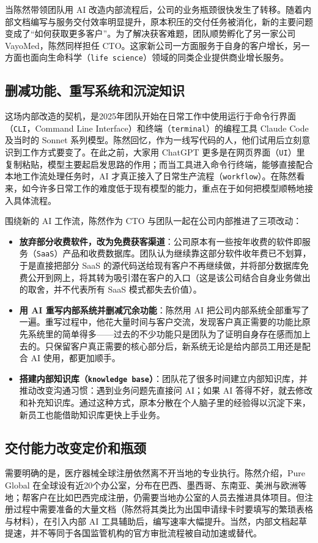 \documentclass[UTF8,a4paper,11pt,fontset=fandol]{ctexart}
\begin{document}
当陈然带领团队用 AI 改造内部流程后，公司的业务瓶颈很快发生了转移。随着内部文档编写与服务交付效率明显提升，原本积压的交付任务被消化，新的主要问题变成了“如何获取更多客户”。为了解决获客难题，团队顺势孵化了另一家公司 VayoMed，陈然同样担任 CTO。这家新公司一方面服务于自身的客户增长，另一方面也面向生命科学（\texttt{life science}）领域的同类企业提供商业增长服务。

\subsection{删减功能、重写系统和沉淀知识}
这场内部改造的契机，是2025年团队开始在日常工作中使用运行于命令行界面（\texttt{CLI}，Command Line Interface）和终端（\texttt{terminal}）的编程工具 Claude Code 及当时的 Sonnet 系列模型。陈然回忆，作为一线写代码的人，他们试用后立刻意识到工作方式要变了。在此之前，大家用 ChatGPT 更多是在网页界面（\texttt{UI}）里复制粘贴，模型主要起启发思路的作用；而当工具进入命令行终端，能够直接配合本地工作流处理任务时，AI 才真正接入了日常生产流程（\texttt{workflow}）。在陈然看来，如今许多日常工作的难度低于现有模型的能力，重点在于如何把模型顺畅地接入具体流程。

围绕新的 AI 工作流，陈然作为 CTO 与团队一起在公司内部推进了三项改动：
\begin{itemize}
\item \textbf{放弃部分收费软件，改为免费获客渠道}：公司原本有一些按年收费的软件即服务（\texttt{SaaS}）产品和收费数据库。团队认为继续靠这部分软件收年费已不划算，于是直接把部分 SaaS 的源代码送给现有客户不再继续做，并将部分数据库免费公开到网上，将其转为吸引潜在客户的入口（这是该公司结合自身业务做出的取舍，并不代表所有 SaaS 模式都失去价值）。
\item \textbf{用 AI 重写内部系统并删减冗余功能}：陈然用 AI 把公司内部系统全部重写了一遍。重写过程中，他花大量时间与客户交流，发现客户真正需要的功能比原先系统里的简单得多——过去的不少功能只是团队为了证明自身存在感而加上去的。只保留客户真正需要的核心部分后，新系统无论是给内部员工用还是配合 AI 使用，都更加顺手。
\item \textbf{搭建内部知识库（\texttt{knowledge base}）}：团队花了很多时间建立内部知识库，并推动改变沟通习惯：遇到业务问题先直接问 AI；如果 AI 答得不好，就去修改和补充知识库。通过这种方式，原本分散在个人脑子里的经验得以沉淀下来，新员工也能借助知识库更快上手业务。
\end{itemize}

\subsection{交付能力改变定价和瓶颈}
需要明确的是，医疗器械全球注册依然离不开当地的专业执行。陈然介绍，Pure Global 在全球设有近20个办公室，分布在巴西、墨西哥、东南亚、美洲与欧洲等地；帮客户在比如巴西完成注册，仍需要当地办公室的人员去推进具体项目。但注册过程中需要准备的大量文档（陈然将其类比为出国申请绿卡时要填写的繁琐表格与材料），在引入内部 AI 工具辅助后，编写速率大幅提升。当然，内部文档起草提速，并不等同于各国监管机构的官方审批流程被自动加速或替代。
\end{document}
